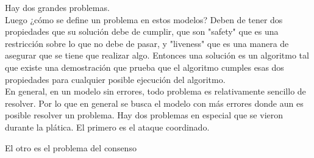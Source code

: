 \documentclass[12pt,a4paper]{report}
\begin{document}
\begin{enumerate}
{		Hay dos grandes problemas.\\
		Luego ¿cómo se define un problema en estos modelos?
		Deben de tener dos propiedades que su solución debe de cumplir, que son
		"safety" que es una restricción sobre lo que no debe de pasar, y "liveness" que es
		una manera de asegurar que se tiene que realizar algo.
		Entonces una solución es un algoritmo tal que existe una demostración que
		prueba que el algoritmo cumples esas dos propiedades para cualquier posible
		ejecución del algoritmo.\\
		En general, en un modelo sin errores, todo problema es relativamente sencillo
		de resolver. Por lo que en general se busca el modelo con más errores donde
		aun es posible resolver un problema.
		Hay dos problemas en especial que se vieron durante la plática.
		El primero es el ataque coordinado.

		El otro es el problema del consenso

	}

\end{enumerate}
\end{document}
